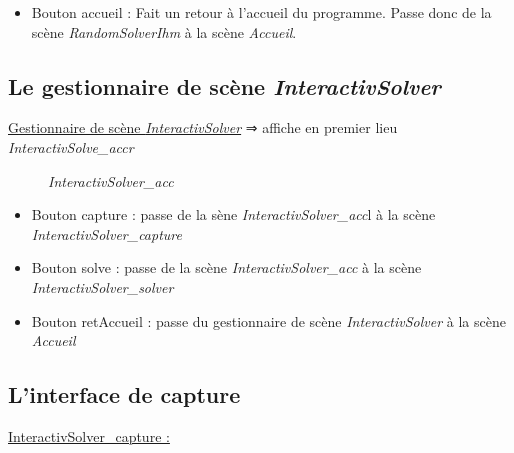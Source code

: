\begin{itemize}
	\item Bouton accueil : Fait un retour à l'accueil du programme. Passe donc de la scène \textit{RandomSolverIhm} à la scène \textit{Accueil}.
\end{itemize}

\subsection{Le gestionnaire de scène \textit{InteractivSolver}}
\underline{Gestionnaire de scène \textit{InteractivSolver}}
⇒ affiche en premier lieu \textit{InteractivSolve\_accr}

\begin{figure}[h]
\begin{center}
\end{center}
	\caption{ \textit{InteractivSolver\_acc}}
\end{figure}

\begin{itemize}
    \item Bouton capture : passe de la sène \textit{InteractivSolver\_acc}l à la scène \textit{InteractivSolver\_capture}
    \item Bouton solve : passe de la scène \textit{InteractivSolver\_acc} à la scène \textit{InteractivSolver\_solver}
    \item Bouton retAccueil : passe du gestionnaire de scène \textit{InteractivSolver} à la scène \textit{Accueil}
\end{itemize}

\subsection{L'interface de capture}
\underline{InteractivSolver\_capture :}

